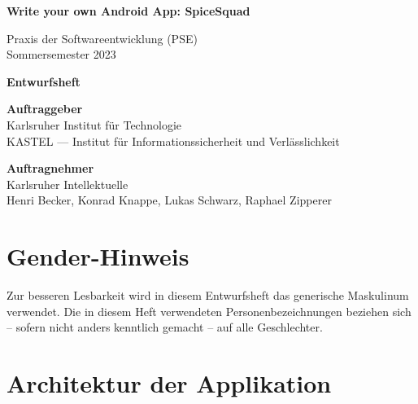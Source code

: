 \documentclass[parskip=full]{scrartcl}
\begin{document}


\begin{titlepage}
    \begin{center}
        \begin{Huge}
            {\textbf{Write your own Android App: SpiceSquad}}
        \end{Huge}
        \vspace{12px}

        Praxis der Softwareentwicklung (PSE)\\
        Sommersemester 2023\\
        \vspace{150px}

        \begin{Huge}
            {\textbf{Entwurfsheft}}
        \end{Huge}
        \vspace{12px}

        \textbf{Auftraggeber}\\
        Karlsruher Institut für Technologie\\
        KASTEL — Institut für Informationssicherheit und Verlässlichkeit\\
        \vspace{330px}

        \textbf{Auftragnehmer}\\
        Karlsruher Intellektuelle\\
        Henri Becker, Konrad Knappe, Lukas Schwarz, Raphael Zipperer\\
    \end{center}
\end{titlepage}

\tableofcontents
\newpage

\section*{Gender-Hinweis}
Zur besseren Lesbarkeit wird in diesem Entwurfsheft das generische Maskulinum verwendet.
Die in diesem Heft verwendeten Personenbezeichnungen beziehen sich – sofern nicht anders kenntlich gemacht – auf alle Geschlechter.
\newpage

\section{Architektur der Applikation}
\end{document}

